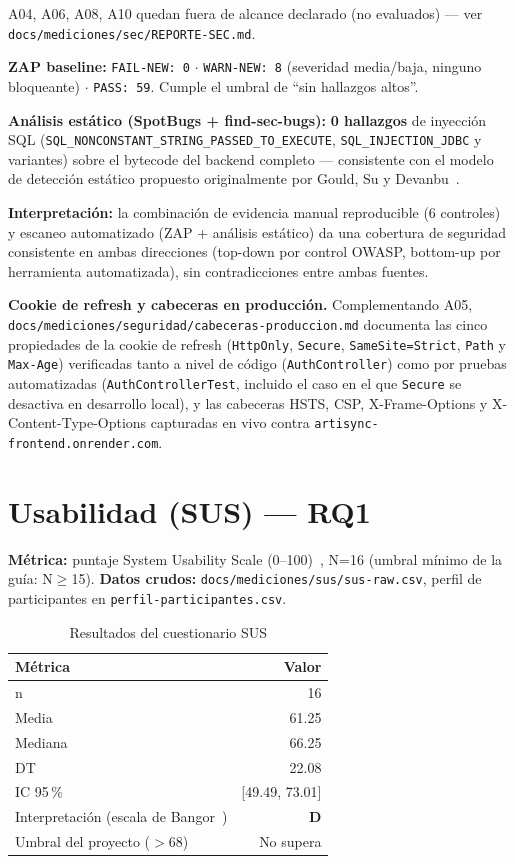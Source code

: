 A04, A06, A08, A10 quedan fuera de alcance declarado (no evaluados) --- ver
\texttt{docs/mediciones/sec/REPORTE-SEC.md}.

\textbf{ZAP baseline:} \texttt{FAIL-NEW: 0} $\cdot$ \texttt{WARN-NEW: 8}
(severidad media/baja, ninguno bloqueante) $\cdot$ \texttt{PASS: 59}.
Cumple el umbral de ``sin hallazgos altos''.

\textbf{Análisis estático (SpotBugs + find-sec-bugs):} \textbf{0
hallazgos} de inyección SQL
(\texttt{SQL\_NONCONSTANT\_STRING\_PASSED\_TO\_EXECUTE},
\texttt{SQL\_INJECTION\_JDBC} y variantes) sobre el bytecode del backend
completo --- consistente con el modelo de detección estático propuesto
originalmente por Gould, Su y Devanbu~\cite{GOULD2004}.

\textbf{Interpretación:} la combinación de evidencia manual reproducible
(6 controles) y escaneo automatizado (ZAP + análisis estático) da una
cobertura de seguridad consistente en ambas direcciones (top-down por
control OWASP, bottom-up por herramienta automatizada), sin
contradicciones entre ambas fuentes.

\textbf{Cookie de refresh y cabeceras en producción.} Complementando A05,
\texttt{docs/mediciones/seguridad/cabeceras-produccion.md} documenta las
cinco propiedades de la cookie de refresh (\texttt{HttpOnly},
\texttt{Secure}, \texttt{SameSite=Strict}, \texttt{Path} y \texttt{Max-Age})
verificadas tanto a nivel de código (\texttt{AuthController}) como por
pruebas automatizadas (\texttt{AuthControllerTest}, incluido el caso en el
que \texttt{Secure} se desactiva en desarrollo local), y las cabeceras HSTS,
CSP, X-Frame-Options y X-Content-Type-Options capturadas en vivo contra
\texttt{artisync-frontend.onrender.com}.

\section{Usabilidad (SUS) --- RQ1}

\textbf{Métrica:} puntaje System Usability Scale
(0--100)~\cite{BROOKE1996}, N=16 (umbral mínimo de la guía: N$\geq$15).
\textbf{Datos crudos:} \texttt{docs/mediciones/sus/sus-raw.csv}, perfil de
participantes en \texttt{perfil-participantes.csv}.

\begin{table}[H]
\centering
\caption{Resultados del cuestionario SUS}
\label{tab:sus}
\begin{tabular}{@{}lr@{}}
\toprule
\textbf{Métrica} & \textbf{Valor} \\
\midrule
n & 16 \\
Media & 61.25 \\
Mediana & 66.25 \\
DT & 22.08 \\
IC 95\,\% & [49.49, 73.01] \\
Interpretación (escala de Bangor~\cite{BANGOR2009}) & \textbf{D} \\
Umbral del proyecto ($>$68) & No supera \\
\bottomrule
\end{tabular}
\end{table}

